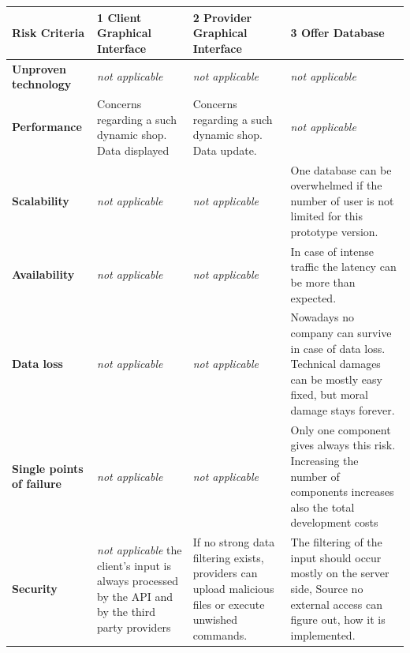 \begin{table}[H]
        \begin{tabularx}{\textwidth}{|l|X|X|X|}
        \toprule
           \textbf{Risk Criteria} & \textbf{1 Client Graphical Interface} & \textbf{2 Provider Graphical Interface} & \textbf{3 Offer Database} \\
        \midrule
        \textbf{Unproven technology}& \textit{not applicable} & \textit{not applicable} & \textit{not applicable} \\
        \hline
        \textbf{Performance} & Concerns regarding a such dynamic shop. Data displayed & Concerns regarding a such dynamic shop. Data update. & \textit{not applicable} \\
        \hline
        \textbf{Scalability} & \textit{not applicable} & \textit{not applicable} & One database can be overwhelmed if the number of user is not limited for this prototype version. \\
        \hline
        \textbf{Availability} & \textit{not applicable} & \textit{not applicable} & In case of intense traffic the latency can be more than expected. \\
        \hline
        \textbf{Data loss} & \textit{not applicable} & \textit{not applicable} & Nowadays no company can survive in case of data loss. Technical damages can be 
        mostly easy fixed, but moral damage stays forever. \\
        \hline
        \textbf{Single points of failure} & \textit{not applicable} & \textit{not applicable} & Only one component gives always this risk. Increasing the 
        number of components increases also the total development costs \\
        \hline
        \textbf{Security} & \textit{not applicable} the client's input is always processed
        by the API and by the third party providers & If no strong data filtering exists, providers can upload
        malicious files or execute unwished commands. & The filtering of the input should occur mostly on the server side, Source
        no external access can figure out, how it is implemented. \\
        \bottomrule
    \end{tabularx}
\end{table}

